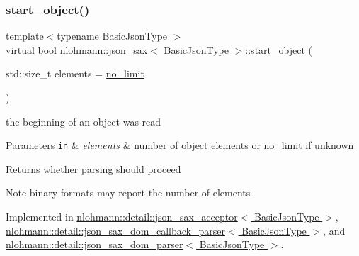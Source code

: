\mbox{\label{structnlohmann_1_1json__sax_a447db60efaabc614492c449e640719cf}} 
\subsubsection{\texorpdfstring{start\+\_\+object()}{start\_object()}}
{\footnotesize\ttfamily template$<$typename Basic\+Json\+Type $>$ \\
virtual bool \hyperlink{structnlohmann_1_1json__sax}{nlohmann\+::json\+\_\+sax}$<$ Basic\+Json\+Type $>$\+::start\+\_\+object (\begin{DoxyParamCaption}\item[{std\+::size\+\_\+t}]{elements = {\ttfamily \hyperlink{structnlohmann_1_1json__sax_a84031c6bbd5b85ec13da024fe9e2b9c9}{no\+\_\+limit}} }\end{DoxyParamCaption})\hspace{0.3cm}{\ttfamily [pure virtual]}}



the beginning of an object was read 


\begin{DoxyParams}[1]{Parameters}
\mbox{\tt in}  & {\em elements} & number of object elements or no\+\_\+limit if unknown \\
\hline
\end{DoxyParams}
\begin{DoxyReturn}{Returns}
whether parsing should proceed 
\end{DoxyReturn}
\begin{DoxyNote}{Note}
binary formats may report the number of elements 
\end{DoxyNote}


Implemented in \hyperlink{classnlohmann_1_1detail_1_1json__sax__acceptor_ace7998d71c96f939facaa19164316193}{nlohmann\+::detail\+::json\+\_\+sax\+\_\+acceptor$<$ Basic\+Json\+Type $>$}, \hyperlink{classnlohmann_1_1detail_1_1json__sax__dom__callback__parser_a6f10254970dbbc484f12752a7a3362b4}{nlohmann\+::detail\+::json\+\_\+sax\+\_\+dom\+\_\+callback\+\_\+parser$<$ Basic\+Json\+Type $>$}, and \hyperlink{classnlohmann_1_1detail_1_1json__sax__dom__parser_aa4b694ee448999880c567218778f5078}{nlohmann\+::detail\+::json\+\_\+sax\+\_\+dom\+\_\+parser$<$ Basic\+Json\+Type $>$}.

